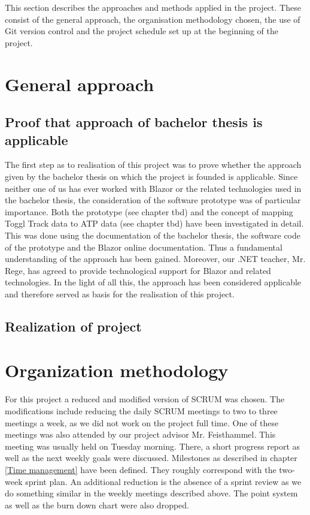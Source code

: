 
This section describes the approaches and methods applied in the project. These consist of the general approach, the organisation methodology chosen, the use of Git version control and the project schedule set up at the beginning of the project.

\section{General approach}
\subsection{Proof that approach of bachelor thesis is applicable}
The first step as to realisation of this project was to prove whether the approach given by the bachelor thesis on which the project is founded is applicable. Since neither one of us has ever worked with Blazor or the related technologies used in the bachelor thesis, the consideration of the software prototype was of particular importance. Both the prototype (see chapter tbd) and the concept of mapping Toggl Track data to ATP data (see chapter tbd) have been investigated in detail. This was done using the documentation of the bachelor thesis, the software code of the prototype and the Blazor online documentation. Thus a fundamental understanding of the approach has been gained. Moreover, our .NET teacher, Mr. Rege, has agreed to provide technological support for Blazor and related technologies. In the light of all this, the approach has been considered applicable and therefore served as basis for the realisation of this project.

\subsection{Realization of project}
\lipsum[1]

\section{Organization methodology}
For this project a reduced and modified version of SCRUM \cite{scrum_url} was chosen. The modifications include reducing the daily SCRUM meetings to two to three meetings a week, as we did not work on the project full time. One of these meetings was also attended by our project advisor Mr. Feisthammel. This meeting was usually held on Tuesday morning. There, a short progress report as well as the next weekly goals were discussed. Milestones as described in chapter \ref{Time management} have been defined. They roughly correspond with the two-week sprint plan. An additional reduction is the absence of a sprint review as we do something similar in the weekly meetings described above. The point system as well as the burn down chart were also dropped.

